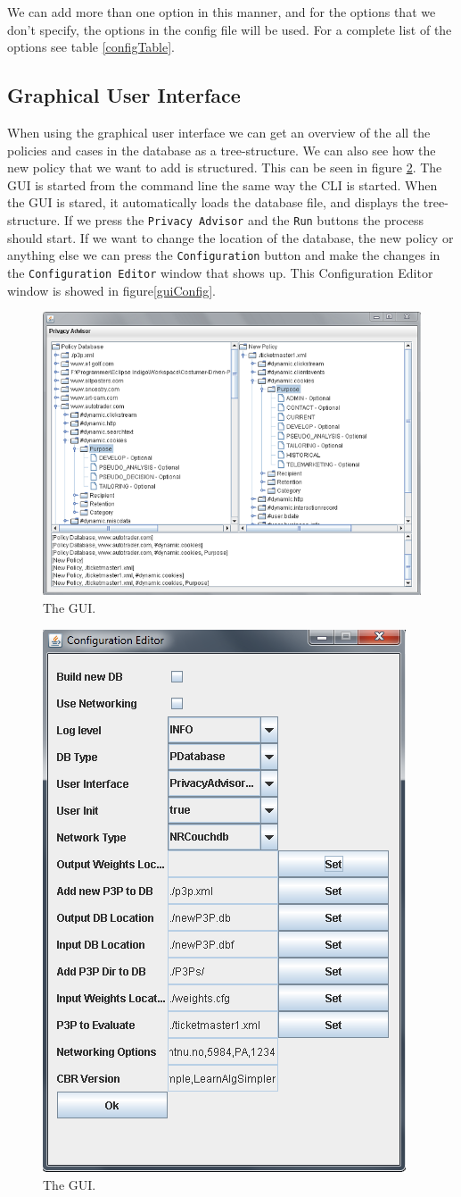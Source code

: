 We can add more than one option in this manner, and for the options that we don't specify, the options in the config file will be used. For a complete list of the options see table \ref{configTable}.

\subsection{Graphical User Interface}
When using the graphical user interface we can get an overview of the all the policies and cases in the database as a tree-structure. We can also see how the new policy that we want to add is structured. This can be seen in figure \ref{guiFigure}. The GUI is started from the command line the same way the CLI is started. When the GUI is stared, it automatically loads the database file, and displays the tree-structure. If we press the \texttt{Privacy Advisor} and  the \texttt{Run} buttons the process should start. If we want to change the location of the database, the new policy or anything else we can press the \texttt{Configuration} button and make the changes in the \texttt{Configuration Editor} window that shows up. This Configuration Editor window is showed in figure\ref{guiConfig}.

 \begin{figure}
     \includegraphics[width = .48\textwidth]{Documentation/gui.png}
     \caption{The GUI.}
   \label{guiFigure}
 \end{figure}

   \begin{figure}
     \includegraphics[width = .48\textwidth]{Documentation/gui_config.png}
     \caption{The GUI.}
   \label{guiFigure}
 \end{figure}


